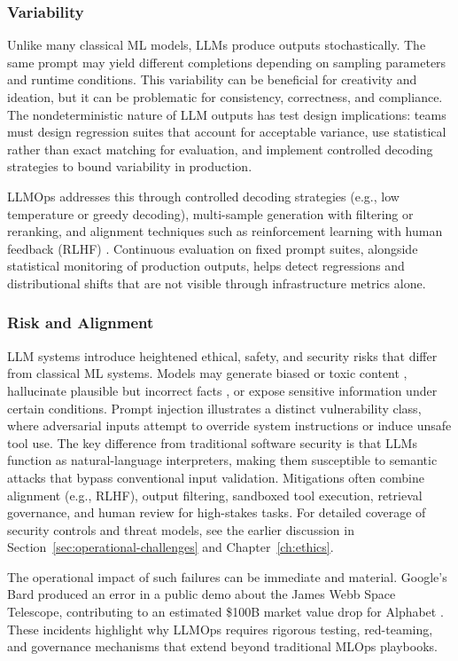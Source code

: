 \subsubsection{Variability}\label{sec:llmops-variability}
Unlike many classical ML models, LLMs produce outputs stochastically. The same prompt may yield different completions depending on sampling parameters and runtime conditions. This variability can be beneficial for creativity and ideation, but it can be problematic for consistency, correctness, and compliance. The nondeterministic nature of LLM outputs has test design implications: teams must design regression suites that account for acceptable variance, use statistical rather than exact matching for evaluation, and implement controlled decoding strategies to bound variability in production.

LLMOps addresses this through controlled decoding strategies (e.g., low temperature or greedy decoding), multi-sample generation with filtering or reranking, and alignment techniques such as reinforcement learning with human feedback (RLHF) \cite{pluralsight}. Continuous evaluation on fixed prompt suites, alongside statistical monitoring of production outputs, helps detect regressions and distributional shifts that are not visible through infrastructure metrics alone.

\subsubsection{Risk and Alignment}\label{sec:llmops-risk-alignment}
LLM systems introduce heightened ethical, safety, and security risks that differ from classical ML systems. Models may generate biased or toxic content \cite{vice}, hallucinate plausible but incorrect facts \cite{vice}, or expose sensitive information under certain conditions. Prompt injection illustrates a distinct vulnerability class, where adversarial inputs attempt to override system instructions or induce unsafe tool use. The key difference from traditional software security is that LLMs function as natural-language interpreters, making them susceptible to semantic attacks that bypass conventional input validation. Mitigations often combine alignment (e.g., RLHF), output filtering, sandboxed tool execution, retrieval governance, and human review for high-stakes tasks. For detailed coverage of security controls and threat models, see the earlier discussion in Section~\ref{sec:operational-challenges} and Chapter~\ref{ch:ethics}.

The operational impact of such failures can be immediate and material. Google's Bard produced an error in a public demo about the James Webb Space Telescope, contributing to an estimated \$100B market value drop for Alphabet \cite{reuters}. These incidents highlight why LLMOps requires rigorous testing, red-teaming, and governance mechanisms that extend beyond traditional MLOps playbooks.

